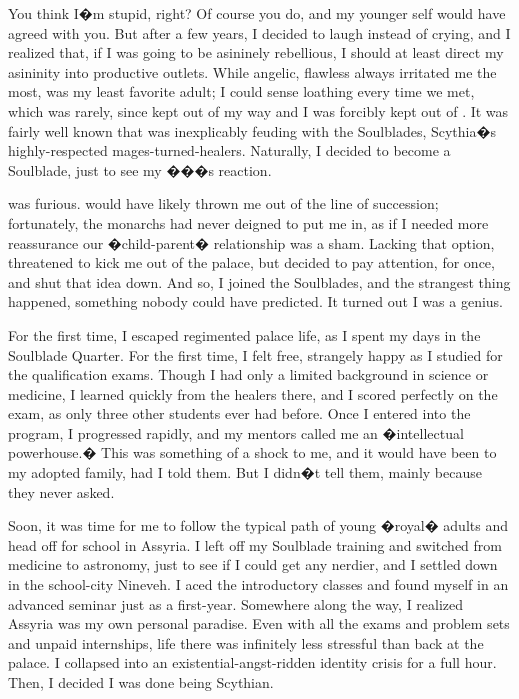 \documentclass[char]{Kos}
\begin{document}
You think I�m stupid, right? Of course you do, and my younger self would have agreed with you. But after a few years, I decided to laugh instead of crying, and I realized that, if I was going to be asininely rebellious, I should at least direct my asininity into productive outlets. While angelic, flawless \cBride{\nickname} always irritated me the most, \cBride{\their} \cScythiaQueen{\parent} \cScythiaQueen{\nickname} was my least favorite adult; I could sense \cScythiaQueen{\their} loathing every time we met, which was rarely, since \cScythiaQueen{\they} kept out of my way and I was forcibly kept out of \cScythiaQueen{\theirs}. It was fairly well known that \cScythiaQueen{\they} was inexplicably feuding with the Soulblades, Scythia�s highly-respected mages-turned-healers. Naturally, I decided to become a Soulblade, just to see my �\cScythiaQueen{\parent}��s reaction.

\cScythiaQueen{\They} was furious. \cScythiaQueen{\They} would have likely thrown me out of the line of succession; fortunately, the monarchs had never deigned to put me in, as if I needed more reassurance our �child-parent� relationship was a sham. Lacking that option, \cScythiaQueen{\they} threatened to kick me out of the palace, but \cScythiaQueen{\their} \cScythiaKing{\spouse} decided to pay attention, for once, and shut that idea down. And so, I joined the Soulblades, and the strangest thing happened, something nobody could have predicted. It turned out I was a genius.

For the first time, I escaped regimented palace life, as I spent my days in the Soulblade Quarter. For the first time, I felt free, strangely happy as I studied for the qualification exams. Though I had only a limited background in science or medicine, I learned quickly from the healers there, and I scored perfectly on the exam, as only three other students ever had before. Once I entered into the program, I progressed rapidly, and my mentors called me an �intellectual powerhouse.� This was something of a shock to me, and it would have been to my adopted family, had I told them. But I didn�t tell them, mainly because they never asked.

Soon, it was time for me to follow the typical path of young �royal� adults and head off for school in Assyria. I left off my Soulblade training and switched from medicine to astronomy, just to see if I could get any nerdier, and I settled down in the school-city Nineveh. I aced the introductory classes and found myself in an advanced seminar just as a first-year. Somewhere along the way, I realized Assyria was my own personal paradise. Even with all the exams and problem sets and unpaid internships, life there was infinitely less stressful than back at the palace. I collapsed into an existential-angst-ridden identity crisis for a full hour. Then, I decided I was done being Scythian.
\end{document}
